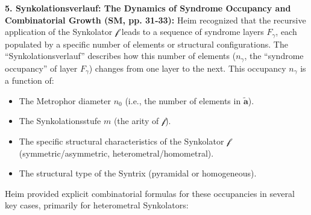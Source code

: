 \documentclass[
    12pt,              %
    a4paper,           %
    headings=normal,   %
    twoside=true,      %
    BCOR=8mm,          %
]{scrbook}
\newcommand{\q}[1]{\enquote{#1}}
\newcommand{\metrophor}{\bm{\widetilde{a}}}
\newcommand{\synkolator}{\mathcal{f}}
\newcommand{\synkolationsstufe}{m}
\newcommand{\syndrom}{F}
\begin{document}
\textbf{5. Synkolationsverlauf: The Dynamics of Syndrome Occupancy and Combinatorial Growth (SM, pp. 31-33):}
Heim recognized that the recursive application of the Synkolator \(\synkolator\) leads to a sequence of syndrome layers \(\syndrom_\gamma\), each populated by a specific number of elements or structural configurations. The \q{Synkolationsverlauf} describes how this number of elements (\(n_\gamma\), the \q{syndrome occupancy} of layer \(\syndrom_\gamma\)) changes from one layer to the next. This occupancy \(n_\gamma\) is a function of:
\begin{itemize}
    \item   The Metrophor diameter \(n_0\) (i.e., the number of elements in \(\metrophor\)).
    \item   The Synkolationsstufe \(\synkolationsstufe\) (the arity of \(\synkolator\)).
    \item   The specific structural characteristics of the Synkolator \(\synkolator\) (symmetric/asymmetric, heterometral/homometral).
    \item   The structural type of the Syntrix (pyramidal or homogeneous).
\end{itemize}
Heim provided explicit combinatorial formulas for these occupancies in several key cases, primarily for heterometral Synkolators:
\end{document}
